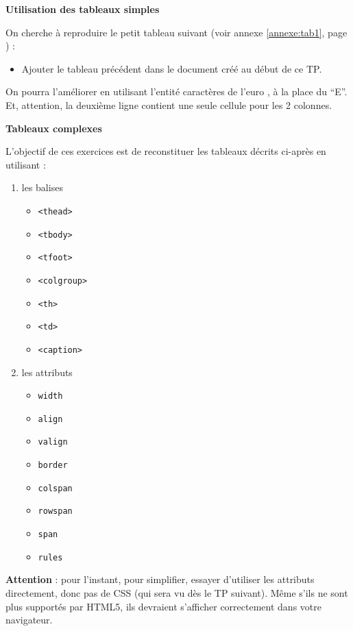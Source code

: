 \documentclass[a4paper,11pt]{article}
\begin{document}
\begin{afaire}
\textbf{Utilisation des tableaux simples}

On cherche à reproduire le petit tableau suivant
(voir annexe \ref{annexe:tab1}, page \pageref{annexe:tab1}) :

\begin{itemize}
    \item Ajouter le tableau précédent dans le document créé au début de ce TP.
\end{itemize}

On pourra l'améliorer en utilisant l'entité caractères de l'euro \texteuro, à la place du ``E''. Et, attention, la deuxième ligne contient une seule cellule pour les 2 colonnes.

\textbf{Tableaux complexes}

L'objectif de ces exercices est de reconstituer les tableaux décrits ci-après en utilisant :

\begin{enumerate}
    \item les balises
    \begin{itemize}
        \item \texttt{<thead>}
        \item \texttt{<tbody>}
        \item \texttt{<tfoot>}
        \item \texttt{<colgroup>}
        \item \texttt{<th>}
        \item \texttt{<td>}
        \item \texttt{<caption>}
    \end{itemize}
    \item les attributs
    \begin{itemize}
        \item \texttt{width}
        \item \texttt{align}
        \item \texttt{valign}
        \item \texttt{border}
        \item \texttt{colspan}
        \item \texttt{rowspan}
        \item \texttt{span}
        \item \texttt{rules}
    \end{itemize}
\end{enumerate}

\textcolor{rougetitre}{\textbf{Attention}} : pour l'instant, pour simplifier, essayer d'utiliser les attributs directement, donc pas de CSS (qui sera vu dès le TP suivant). Même s'ils ne sont plus supportés par HTML5, ils devraient s'afficher correctement dans votre navigateur.


\end{afaire}
\end{document}
